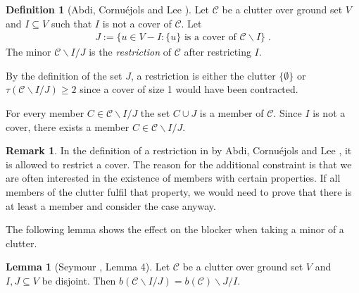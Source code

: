 \documentclass[a4paper, 12pt]{scrbook}
\theoremstyle{definition}
\newtheorem*{definition}{Definition}
\newtheorem*{remark}{Remark}
\newtheorem{lemma}[theorem]{Lemma}
\begin{document}
\begin{definition}[Abdi, Cornuéjols and Lee \cite{restrictions}]
    Let $\mathcal{C}$ be a clutter over ground set $V$ and $I \subseteq V$ such that $I$ is not a cover of $\mathcal{C}$.
    Let
    \begin{align*}
        J := \{u \in V-I : \{u\} \text{ is a cover of } \mathcal{C} \backslash I\} \;.
    \end{align*}
    The minor $\mathcal{C} \backslash I / J$ is the \emph{restriction} of $\mathcal{C}$ after restricting $I$.
\end{definition}

By the definition of the set $J$, a restriction is either the clutter $\{\emptyset\}$ or $\tau(\mathcal{C}\backslash I /J) \geq 2$ since a cover of size 1 would have been contracted.

For every member $C \in \mathcal{C} \backslash I /J$ the set $C \cup J$ is a member of $\mathcal{C}$.
Since $I$ is not a cover, there exists a member $C \in \mathcal{C} \backslash I /J$.

\begin{remark}
    In the definition of a restriction in by Abdi, Cornuéjols and Lee \cite{restrictions}, it is allowed to restrict a cover.
    The reason for the additional constraint is that we are often interested in the existence of members with certain properties.
    If all members of the clutter fulfil that property, we would need to prove that there is at least a member and consider the case anyway.
\end{remark}

The following lemma shows the effect on the blocker when taking a minor of a clutter.
\begin{lemma}[Seymour \cite{binary}, Lemma 4]
    Let $\mathcal{C}$ be a clutter over ground set $V$ and $I,J \subseteq V$ be disjoint.
    Then $b(\mathcal{C}\backslash I /J) = b(\mathcal{C}) \backslash J / I$.
\end{lemma}
\end{document}
